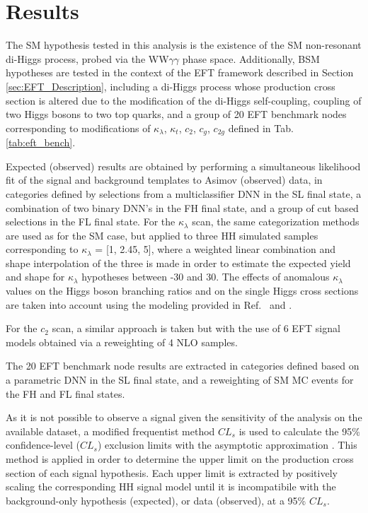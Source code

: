 \section{Results} \label{sec:results}

The SM hypothesis tested in this analysis is the existence of the SM non-resonant di-Higgs process, probed via the WW$\gamma\gamma$ phase space. Additionally, BSM hypotheses are tested in the context of the 
EFT framework described in Section \ref{sec:EFT_Description}, including a di-Higgs process whose production cross section is altered due to the modification 
of the di-Higgs self-coupling, coupling of two Higgs bosons to two top quarks, and a group of 20 EFT benchmark nodes corresponding to modifications 
of $\kappa_{\lambda}$, $\kappa_{t}$, $c_{2}$, $c_{g}$, $c_{2g}$ defined in Tab. \ref{tab:eft_bench}. 

Expected (observed) results are obtained by performing a simultaneous likelihood fit of the signal and 
background templates to Asimov (observed) data, in categories defined by selections from a multiclassifier DNN in the SL final state, a combination 
of two binary DNN's in the FH final state, and a group of cut based selections in the FL final state. For the $\kappa_{\lambda}$ scan, the same categorization methods are used as for the 
SM case, but applied to three HH simulated samples corresponding to $\kappa_{\lambda}$ = [1, 2.45, 5], where a weighted linear combination and shape interpolation of the three is made in order to estimate 
the expected yield and shape for $\kappa_{\lambda}$ hypotheses between -30 and 30. The effects of anomalous $\kappa_{\lambda}$ values on the Higgs boson branching ratios and on the single Higgs cross sections are taken into account using the modeling provided in Ref.~\cite{Degrassi:2016wml} and \cite{Maltoni:2017ims}.

For the $c_{2}$ scan, a similar approach is taken but with the use of 6 EFT signal models obtained via a reweighting of 4 NLO samples. 

The 20 EFT benchmark node results are extracted in categories defined based on a parametric DNN in the SL final state, and a reweighting of SM MC events for the FH and FL final states.  

As it is not possible to observe a signal given the sensitivity of the analysis on the available dataset, a modified frequentist method $CL_s$ \cite{CLS1, CLS2} is used to 
calculate the 95\% confidence-level ($CL_{s}$) exclusion limits with the asymptotic approximation \cite{Cowan:2010js}. This method is applied in order to determine the upper limit 
on the production cross section of each signal hypothesis. Each upper limit is extracted by positively scaling the corresponding 
HH signal model until it is incompatibile with the background-only hypothesis (expected), or data (observed), at a 95\% $CL_{s}$.   

